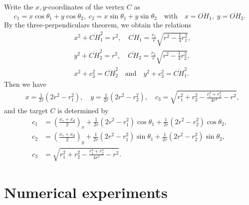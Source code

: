 \documentclass[10pt]{article}
\newtheorem{remark}[theorem]{Remark}
\numberwithin{equation}{section}
\numberwithin{figure}{section}
\begin{document}
Write the $x,y$-coordinates of the vertex $C$ as
$$
c_1 = x \cos\theta_1 +  y \cos\theta_2, \;
c_2 = x \sin\theta_1 +  y \sin\theta_2 \quad \mbox{with}
\quad x = \overline{OH}_1, \; y = \overline{OH}_2.
$$
By the three-perpendiculars theorem, we obtain the relations
\begin{equation}
\begin{split}
&x^2 + \overline{CH}_1^2 = r^2,  \quad \overline{CH}_1 = \frac{r_1}{r} \sqrt{r^2 - \frac{1}{4}r_1^2}, \\
&y^2 + \overline{CH}_2^2 = r^2,  \quad \overline{CH}_2 = \frac{r_2}{r} \sqrt{r^2 - \frac{1}{4}r_2^2}, \\
&x^2 + c_3^2 = \overline{CH}_2^2 \quad \mbox{and} \quad y^2 + c_3^2 = \overline{CH}_1^2. 
\end{split}
\end{equation}
Then we have 
\begin{equation}
\begin{split}
&x = \frac{1}{2r} (2r^2-r_1^2), \quad y = \frac{1}{2r} (2r^2-r_2^2), \quad
c_3 = \sqrt{r_1^2+r_2^2-\frac{r_1^4+r_2^4}{4r^2}-r^2},
\end{split}
\end{equation}
and the target $C$ is determined by 
\begin{equation}\label{ex_form_recover}
\begin{split}
 c_1 &= \left( \frac{x_s+x_d}{2} \right)_x
+ \frac{1}{2r} (2r^2-r_1^2)\cos\theta_1 +
 \frac{1}{2r} (2r^2-r_2^2)\cos\theta_2 , \\
c_2 &= \left( \frac{x_s+x_d}{2} \right)_y
+  \frac{1}{2r} (2r^2-r_1^2)\sin\theta_1 +
 \frac{1}{2r} (2r^2-r_2^2)\sin\theta_2 , \\
c_3 &= \sqrt{r_1^2+r_2^2-\frac{r_1^4+r_2^4}{4r^2}-r^2}.
\end{split}
\end{equation}
\begin{comment}
\begin{remark} On the inversion scheme, one can select a quadrant, where the target lies in the quadrant by comparing the value of the radius $r_1$ to the initial radius $r$. If $r_1 \ge \sqrt{2} r$, then the increment $x$ in the direction $\theta_1$ is negative which implies there is the target in the opposite direction $-\theta_1$. 
\end{remark}
\end{comment}

\section{Numerical experiments}\label{sec_numericexp}
\end{document}
